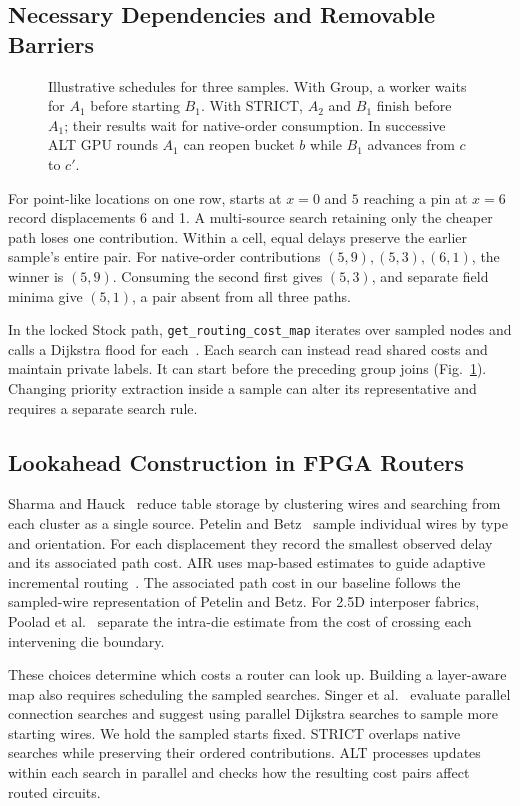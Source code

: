 \subsection{Necessary Dependencies and Removable Barriers}
\begin{figure}[t]
\centering
{\footnotesize}
\caption{Illustrative schedules for three samples. With Group, a worker waits for $A_1$ before starting $B_1$. With STRICT, $A_2$ and $B_1$ finish before $A_1$; their results wait for native-order consumption. In successive ALT GPU rounds $A_1$ can reopen bucket $b$ while $B_1$ advances from $c$ to $c\prime$.}\label{fig:contracts}
\end{figure}
For point-like locations on one row, starts at $x=0$ and $5$ reaching a pin at $x=6$ record displacements 6 and 1. A multi-source search retaining only the cheaper path loses one contribution. Within a cell, equal delays preserve the earlier sample's entire pair. For native-order contributions $(5,9),(5,3),(6,1)$, the winner is $(5,9)$. Consuming the second first gives $(5,3)$, and separate field minima give $(5,1)$, a pair absent from all three paths.

In the locked Stock path, \texttt{get\_routing\_cost\_map} iterates over sampled nodes and calls a Dijkstra flood for each~\cite{lockedvtr}. Each search can instead read shared costs and maintain private labels. It can start before the preceding group joins (Fig.~\ref{fig:contracts}). Changing priority extraction inside a sample can alter its representative and requires a separate search rule.

\subsection{Lookahead Construction in FPGA Routers}
Sharma and Hauck~\cite{adaptive_astar} reduce table storage by clustering wires and searching from each cluster as a single source. Petelin and Betz~\cite{diversity} sample individual wires by type and orientation. For each displacement they record the smallest observed delay and its associated path cost. AIR uses map-based estimates to guide adaptive incremental routing~\cite{air}. The associated path cost in our baseline follows the sampled-wire representation of Petelin and Betz. For 2.5D interposer fabrics, Poolad et al.~\cite{multidie} separate the intra-die estimate from the cost of crossing each intervening die boundary.

These choices determine which costs a router can look up. Building a layer-aware map also requires scheduling the sampled searches. Singer et al.~\cite{multiqueue} evaluate parallel connection searches and suggest using parallel Dijkstra searches to sample more starting wires. We hold the sampled starts fixed. STRICT overlaps native searches while preserving their ordered contributions. ALT processes updates within each search in parallel and checks how the resulting cost pairs affect routed circuits.
